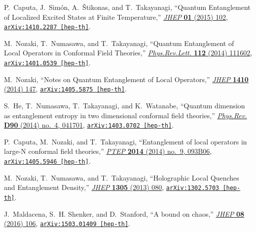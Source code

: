 \begin{thebibliography}{100}
P.~Caputa, J.~Sim{\'o}n, A.~{\v S}tikonas, and T.~Takayanagi, ``{Quantum
  Entanglement of Localized Excited States at Finite Temperature},''
  \href{http://dx.doi.org/10.1007/JHEP01(2015)102}{{\em JHEP} {\bf 01} (2015)
  102},
\href{http://arxiv.org/abs/1410.2287}{{\tt arXiv:1410.2287 [hep-th]}}.

M.~Nozaki, T.~Numasawa, and T.~Takayanagi, ``{Quantum Entanglement of Local
  Operators in Conformal Field Theories},''
  \href{http://dx.doi.org/10.1103/PhysRevLett.112.111602}{{\em Phys.Rev.Lett.}
  {\bf 112} (2014)  111602},
\href{http://arxiv.org/abs/1401.0539}{{\tt arXiv:1401.0539 [hep-th]}}.

M.~Nozaki, ``{Notes on Quantum Entanglement of Local Operators},''
  \href{http://dx.doi.org/10.1007/JHEP10(2014)147}{{\em JHEP} {\bf 1410} (2014)
   147},
\href{http://arxiv.org/abs/1405.5875}{{\tt arXiv:1405.5875 [hep-th]}}.

S.~He, T.~Numasawa, T.~Takayanagi, and K.~Watanabe, ``{Quantum dimension as
  entanglement entropy in two dimensional conformal field theories},''
  \href{http://dx.doi.org/10.1103/PhysRevD.90.041701}{{\em Phys.Rev.} {\bf D90}
  (2014) no.~4, 041701},
\href{http://arxiv.org/abs/1403.0702}{{\tt arXiv:1403.0702 [hep-th]}}.

P.~Caputa, M.~Nozaki, and T.~Takayanagi, ``{Entanglement of local operators in
  large-N conformal field theories},''
  \href{http://dx.doi.org/10.1093/ptep/ptu122}{{\em PTEP} {\bf 2014} (2014)
  no.~9, 093B06},
\href{http://arxiv.org/abs/1405.5946}{{\tt arXiv:1405.5946 [hep-th]}}.

M.~Nozaki, T.~Numasawa, and T.~Takayanagi, ``{Holographic Local Quenches and
  Entanglement Density},''
  \href{http://dx.doi.org/10.1007/JHEP05(2013)080}{{\em JHEP} {\bf 1305} (2013)
   080},
\href{http://arxiv.org/abs/1302.5703}{{\tt arXiv:1302.5703 [hep-th]}}.

J.~Maldacena, S.~H. Shenker, and D.~Stanford, ``{A bound on chaos},''
  \href{http://dx.doi.org/10.1007/JHEP08(2016)106}{{\em JHEP} {\bf 08} (2016)
  106},
\href{http://arxiv.org/abs/1503.01409}{{\tt arXiv:1503.01409 [hep-th]}}.


\end{thebibliography}
